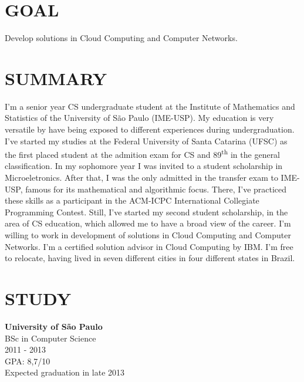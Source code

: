 \documentclass[margin=<value>,11pt]{res} %
\begin{document}

\address{R. Indiana, 998 -- São Paulo, SP 04562-001\\
        (+55 11) 97132-1145, (+55 11) 2389-7150 \\ \texttt{pedro@vezza.com.br}}

\begin{resume}
 
\section{GOAL}
	Develop solutions in Cloud Computing and Computer Networks.
 
\section{SUMMARY}
I'm a senior year CS undergraduate student at the Institute of Mathematics and Statistics of the University of São Paulo (IME-USP). My education is very versatile by have being exposed to different experiences during undergraduation. I've started my studies at the Federal University of Santa Catarina (UFSC) as the first placed student at the admition exam for CS and 89\textsuperscript{th} in the general classification. In my sophomore year I was invited to a student scholarship in Microeletronics. After that, I was the only admitted in the transfer exam to IME-USP, famous for its mathematical and algorithmic focus. There, I've practiced these skills as a participant in the ACM-ICPC International Collegiate Programming Contest. Still, I've started my second student scholarship, in the area of CS education, which allowed me to have a broad view of the career. I'm willing to work in development of solutions in Cloud Computing and Computer Networks. I'm a certified solution advisor in Cloud Computing by IBM. I'm free to relocate, having lived in seven different cities in four different states in Brazil.

\section{STUDY} 
	{\bf University of São Paulo}\\
	BSc in Computer Science \\
	2011 - 2013 \\
	GPA: 8,7/10 \\
	Expected graduation in late 2013


\end{resume}
\end{document}
